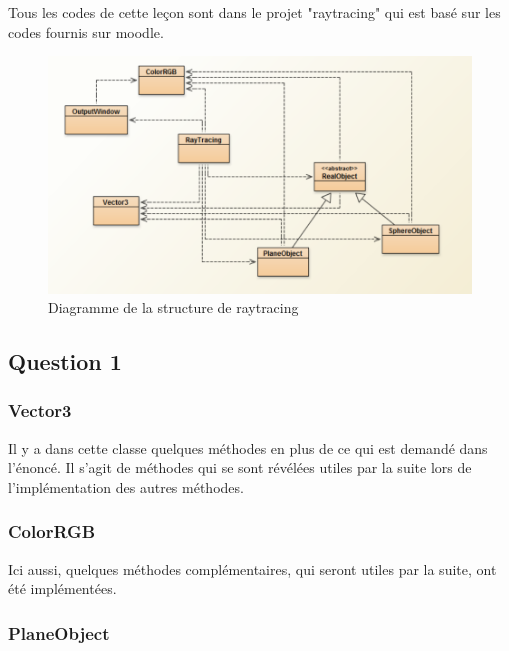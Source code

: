 Tous les codes de cette leçon sont dans le projet "raytracing" qui est basé sur les codes fournis sur moodle. 

\begin{figure}[H]
	\caption{\label{9_structure} Diagramme de la structure de raytracing}
	\centering
	\includegraphics[scale = 0.4]{9_structure.png}
\end{figure}

\subsection{Question 1}

\subsubsection{Vector3}

Il y a dans cette classe quelques méthodes en plus de ce qui est demandé dans l'énoncé. Il s'agit de méthodes qui se sont révélées utiles par la suite lors de l'implémentation des autres méthodes.


\subsubsection{ColorRGB}

Ici aussi, quelques méthodes complémentaires, qui seront utiles par la suite, ont été implémentées.


\subsubsection{PlaneObject}

